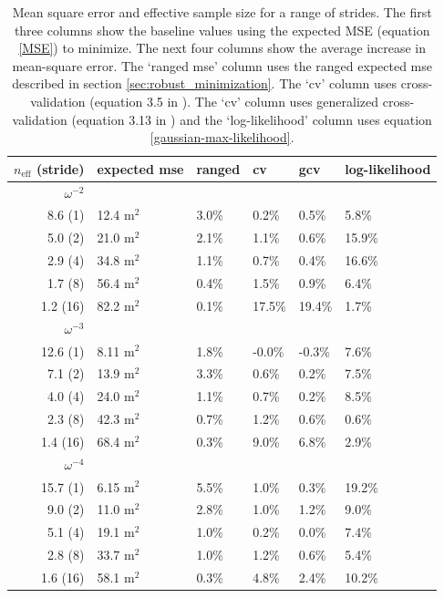 \documentclass[10pt,journal]{IEEEtran}
\begin{document}
\begin{table}[ht]
\caption{Mean square error and effective sample size for a range of strides.  The first three columns show the baseline values using the expected MSE (equation \ref{MSE}) to minimize. The next four columns show the average increase in mean-square error. The `ranged mse' column uses the ranged expected mse described in section \ref{sec:robust_minimization}. The `cv' column uses cross-validation (equation 3.5 in \cite{green1994-book}).  The `cv' column uses generalized cross-validation (equation 3.13 in \cite{green1994-book}) and the `log-likelihood' column uses equation \ref{gaussian-max-likelihood}.}
\label{fit_results_gaussian_other_methods}
\centering
\begin{tabular}{r p{1cm} | p{1cm}p{1cm}p{1cm}p{1cm}} $n_\textrm{eff}$ (stride) & expected mse & ranged & cv & gcv & log-likelihood \\ \hline \hline 
$\omega^{-2}$ &&&&&  \\ \hline 
8.6 (1) & 12.4 m$^2$ &  3.0\% &  0.2\% &  0.5\% & 5.8\% \\ 
5.0 (2) & 21.0 m$^2$ &  2.1\% &  1.1\% &  0.6\% & 15.9\% \\ 
2.9 (4) & 34.8 m$^2$ &  1.1\% &  0.7\% &  0.4\% & 16.6\% \\ 
1.7 (8) & 56.4 m$^2$ &  0.4\% &  1.5\% &  0.9\% & 6.4\% \\ 
1.2 (16) & 82.2 m$^2$ &  0.1\% &  17.5\% &  19.4\% & 1.7\% \\ 
$\omega^{-3}$ &&&&&  \\ \hline 
12.6 (1) & 8.11 m$^2$ &  1.8\% &  -0.0\% &  -0.3\% & 7.6\% \\ 
7.1 (2) & 13.9 m$^2$ &  3.3\% &  0.6\% &  0.2\% & 7.5\% \\ 
4.0 (4) & 24.0 m$^2$ &  1.1\% &  0.7\% &  0.2\% & 8.5\% \\ 
2.3 (8) & 42.3 m$^2$ &  0.7\% &  1.2\% &  0.6\% & 0.6\% \\ 
1.4 (16) & 68.4 m$^2$ &  0.3\% &  9.0\% &  6.8\% & 2.9\% \\ 
$\omega^{-4}$ &&&&&  \\ \hline 
15.7 (1) & 6.15 m$^2$ &  5.5\% &  1.0\% &  0.3\% & 19.2\% \\ 
9.0 (2) & 11.0 m$^2$ &  2.8\% &  1.0\% &  1.2\% & 9.0\% \\ 
5.1 (4) & 19.1 m$^2$ &  1.0\% &  0.2\% &  0.0\% & 7.4\% \\ 
2.8 (8) & 33.7 m$^2$ &  1.0\% &  1.2\% &  0.6\% & 5.4\% \\ 
1.6 (16) & 58.1 m$^2$ &  0.3\% &  4.8\% &  2.4\% & 10.2\% \\ 
\end{tabular} 

\end{table}
\end{document}
